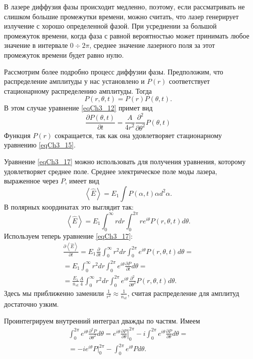 В лазере диффузия фазы происходит медленно, поэтому, если
рассматривать не слишком большие промежутки времени, можно считать,
что лазер генерирует излучение с хорошо определенной фазой. При
усреднении за большой промежуток времени, когда фаза с равной
вероятностью может принимать любое значение в интервале  $0 \div 2
\pi$,  среднее значение лазерного поля за этот промежуток времени 
будет равно нулю.  

Рассмотрим более подробно процесс диффузии фазы. Предположим, что
распределение амплитуды у нас установлено и $P\left(r\right)$
соответствует стационарному распределению амплитуды. Тогда
\[
P\left(r, \theta, t\right) = P\left(r\right) P\left(\theta, t\right).
\]
В этом случае уравнение \eqref{eqCh3_12} примет вид 
\begin{equation}
\frac{\partial P \left(\theta, t\right)}{\partial t} = 
\frac{A}{4 r^2}
\frac{\partial^2}{\partial \theta^2}
P \left(\theta, t\right)
\label{eqCh3_17}
\end{equation}
Функция $P\left(r\right)$ сокращается, так как она удовлетворяет
стационарному уравнению \eqref{eqCh3_15}. 

Уравнение \eqref{eqCh3_17} можно использовать для получения уравнения,
которому удовлетворяет среднее поле. Среднее электрическое поле моды
лазера, выраженное через $P$, имеет вид  
\[
\left<\hat{E}\right> = E_1 \int P\left(\alpha, t\right) \alpha d^2
\alpha.
\]
В полярных координатах это выглядит так:
\[
\left<\hat{E}\right> = E_1 \int_{0}^{\infty}r dr \int_0^{2 \pi}r e^{i
  \theta} P\left(r, \theta, t\right) d \theta.
\]
Используем теперь уравнение \eqref{eqCh3_17}:
\begin{eqnarray}
\frac{\partial \left<\hat{E}\right>}{\partial t}
= E_1 \frac{\partial}{\partial t} \int_{0}^{\infty}r^2 dr \int_0^{2
  \pi} e^{i
  \theta} P\left(r, \theta, t\right) d \theta = 
\nonumber \\
= E_1 \int_0^{\infty}r^2 dr \int_0^{2\pi}e^{i\theta}\frac{\partial
  P}{\partial t} d \theta
=
\nonumber \\
= \frac{E_1}{\bar{n}_{st}} \frac{A}{4}
\int_{0}^{\infty}r^2 dr \int_0^{2 \pi}e^{i
  \theta} \frac{\partial^2}{\partial \theta^2} P\left(r, \theta,
t\right) d \theta. 
\label{eqCh3_18}
\end{eqnarray}
Здесь мы приближенно заменили $\frac{1}{r^2} \approx
\frac{1}{\bar{n}_{st}}$, считая распределение для амплитуд достаточно
узким. 

Проинтегрируем внутренний интеграл дважды по частям. Имеем
\begin{eqnarray}
\int_0^{2 \pi} e^{i \theta}
\frac{\partial^2 P}{\partial \theta^2} d \theta = 
e^{i \theta} \left.\frac{\partial P}{\partial \theta}\right|_0^{2 \pi}
- i \int_0^{2 \pi} e^{i \theta}
\frac{\partial P}{\partial \theta} d \theta = 
\nonumber \\
= -i e^{i \theta} \left. P \right|_0^{2 \pi} - 
\int_0^{2 \pi} e^{i \theta} P d \theta.
\label{eqCh3_19}
\end{eqnarray}

